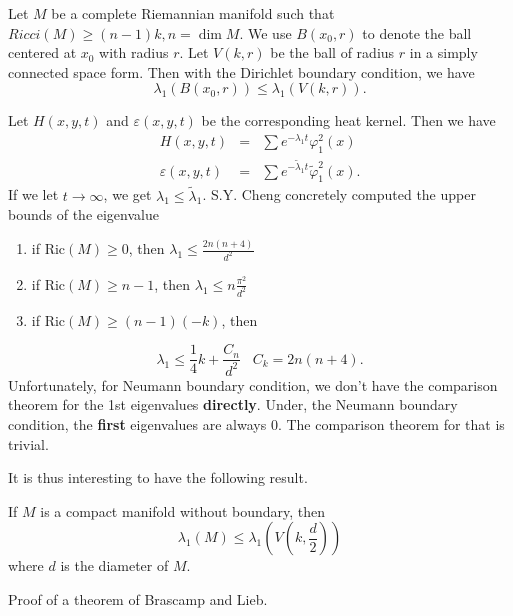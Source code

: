 \begin{theorem}Let $M$ be a complete Riemannian manifold such that $ Ricci (M) \geq (n-1) k , n = \dim M$. We use $ B (x_0, r) $ to denote the ball centered at $ x _0$ with radius $r$. Let $ V (k, r)$ be the ball of radius $r$ in a simply connected space form. Then with the Dirichlet boundary condition, we have 
%
\[ \lambda _1 (B (x_0, r)) \leq \lambda _1 (V (k, r)).\]
\end{theorem}

 Let $H(x, y, t) $ and $ \varepsilon (x, y, t) $ be the corresponding heat kernel. Then we have 
%
\begin{eqnarray*}
 H (x, y, t) &=& \sum e^{-\lambda _1t}  \varphi ^2 _1 (x) \\
\varepsilon (x, y, t) & = & \sum e^{-\tilde{\lambda} _1t}  \tilde{\varphi} ^2 _1 (x).
\end{eqnarray*}
If we let $ t \rightarrow \infty$, we get $ \lambda _1 \leq \tilde{\lambda}_1 $.
S.Y. Cheng concretely computed the upper bounds of the eigenvalue
\begin{enumerate}
  \item if   Ric$(M) \geq 0$, then $ \lambda _1 \leq \frac{2n(n+4)}{d^2} $ 
  \item if   Ric$(M) \geq n-1$, then $ \lambda _1  \leq n\frac{\pi^2}{d^2} $
  \item if   Ric$(M) \geq (n-1) (-k) $, then 
  \end{enumerate}  
\[ \lambda_1 \leq \frac{1}{4} k + \frac{C_n}{d^2} \;\;\; C_k = 2n (n+4).\]
%
Unfortunately, for Neumann boundary condition, we don't have the comparison theorem for the 1st eigenvalues {\bf directly}. Under, the Neumann boundary condition, the {\bf first} eigenvalues are always 0. The comparison theorem for that is trivial.

It is thus interesting to have the following result.

\begin{theorem}If $M$ is a compact manifold without boundary, then 
%
\[ \lambda _1 (M) \leq \lambda _1 \left(V \left(k, \frac{d}{2}\right)\right)\]
%
where $d$ is the diameter of $M$.
\end{theorem}


Proof of a theorem of Brascamp and Lieb.

